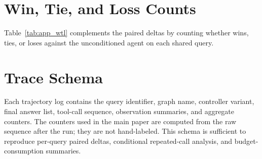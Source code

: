 \begin{table}[h]
\centering
\caption{Held-out aggregate deltas.}
\label{tab:app_deltas}
\end{table}

\section{Win, Tie, and Loss Counts}
Table~\ref{tab:app_wtl} complements the paired deltas by counting whether \tb wins, ties, or loses against the unconditioned agent on each shared query.

\begin{table}[h]
\centering
\caption{Paired win/tie/loss counts for \tb versus the unconditioned agent. Counts are computed on the same shared logged query IDs as Table~\ref{tab:paired}.}
\label{tab:app_wtl}
\end{table}

\section{Trace Schema}
Each trajectory log contains the query identifier, graph name, controller variant, final answer list, tool-call sequence, observation summaries, and aggregate counters. The counters used in the main paper are computed from the raw sequence after the run; they are not hand-labeled. This schema is sufficient to reproduce per-query paired deltas, conditional repeated-call analysis, and budget-consumption summaries.



